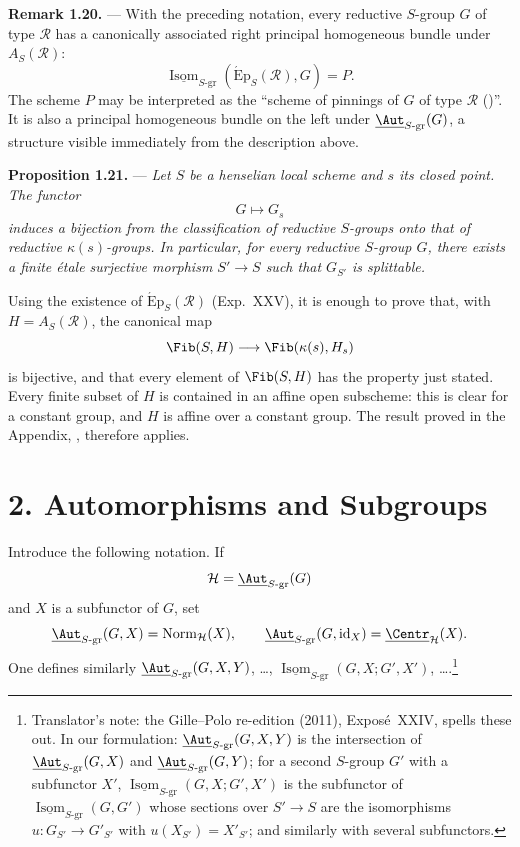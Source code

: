 \medskip\noindent\textbf{Remark 1.20.} ---
With the preceding notation, every reductive \(S\)-group \(G\) of
type \(\mathscr R\) has a canonically associated right principal
homogeneous bundle under \(A_S(\mathscr R)\):
\[
  \underline{\operatorname{Isom}}_{S\text{-}\mathrm{gr}}
    (\operatorname{\acute{E}p}_S(\mathscr R),G)=P.
\]
The scheme \(P\) may be interpreted as the ``scheme of pinnings of
\(G\) of type \(\mathscr R\) ()''. It is also a principal
homogeneous bundle on the left under
\(\underline{\Aut}_{S\text{-}\mathrm{gr}}(G)\), a structure visible
immediately from the description above.

\medskip\noindent\textbf{Proposition 1.21.} ---
{\itshape Let \(S\) be a henselian local scheme and \(s\) its closed
point. The functor
\[
  G\longmapsto G_s
\]
induces a bijection from the classification of reductive
\(S\)-groups onto that of reductive
\(\kappa(s)\)-groups. In particular, for every reductive \(S\)-group
\(G\), there exists a finite étale surjective morphism \(S'\to S\)
such that \(G_{S'}\) is splittable.}

Using the existence of \(\operatorname{\acute{E}p}_S(\mathscr R)\)
(Exp.~XXV), it is enough to prove that, with
\(H=A_S(\mathscr R)\), the canonical map
\[
  \Fib(S,H)\longrightarrow\Fib(\kappa(s),H_s)
\]
is bijective, and that every element of \(\Fib(S,H)\) has the property
just stated. Every finite subset of \(H\) is contained in an affine
open subscheme: this is clear for a constant group, and \(H\) is
affine over a constant group. The result proved in the Appendix,
, therefore applies.

\section*{2. Automorphisms and Subgroups}

Introduce the following notation. If
\[
  \mathcal H=\underline{\Aut}_{S\text{-}\mathrm{gr}}(G)
\]
and \(X\) is a subfunctor of \(G\), set
\[
  \underline{\Aut}_{S\text{-}\mathrm{gr}}(G,X)
  =\operatorname{Norm}_{\mathcal H}(X),
  \qquad
  \underline{\Aut}_{S\text{-}\mathrm{gr}}(G,\operatorname{id}_X)
  =\underline{\Centr}_{\mathcal H}(X).
\]
One defines similarly
\(\underline{\Aut}_{S\text{-}\mathrm{gr}}(G,X,Y)\), \ldots,
\(\underline{\operatorname{Isom}}_{S\text{-}\mathrm{gr}}(G,X;G',X')\), \ldots.\footnote{Translator's note: the Gille--Polo re-edition (2011), Exposé~XXIV,
spells these out. In our formulation: \(\underline{\Aut}_{S\text{-}\mathrm{gr}}(G,X,Y)\) is the
intersection of \(\underline{\Aut}_{S\text{-}\mathrm{gr}}(G,X)\) and
\(\underline{\Aut}_{S\text{-}\mathrm{gr}}(G,Y)\); for a second \(S\)-group \(G'\) with a
subfunctor \(X'\), \(\underline{\operatorname{Isom}}_{S\text{-}\mathrm{gr}}(G,X;G',X')\) is the
subfunctor of \(\underline{\operatorname{Isom}}_{S\text{-}\mathrm{gr}}(G,G')\) whose sections over
\(S'\to S\) are the isomorphisms \(u\colon G_{S'}\to G'_{S'}\) with \(u(X_{S'})=X'_{S'}\); and
similarly with several subfunctors.}

